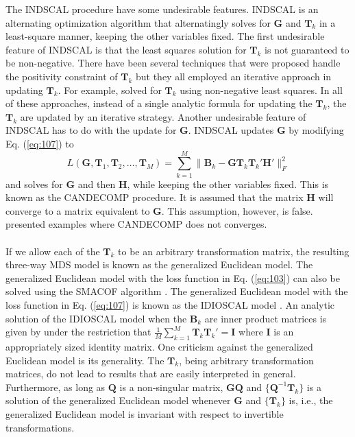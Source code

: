\noindent The INDSCAL procedure have some undesirable features.
INDSCAL is an alternating optimization algorithm that alternatingly
solves for $\mathbf{G}$ and $\mathbf{T}_k$ in a least-square manner,
keeping the other variables fixed. The first undesirable feature of
INDSCAL is that the least squares solution for
$\mathbf{T}_k$ is not guaranteed to be non-negative. There have been
several techniques that were proposed handle the positivity constraint of
$\mathbf{T}_k$ but they all employed an iterative approach in updating
$\mathbf{T}_k$. For example, \citet{berge93:_comput_indsc} solved for
$\mathbf{T}_k$ using non-negative least squares. In all of these
approaches, instead of a single analytic formula for updating the
$\mathbf{T}_k$, the $\mathbf{T}_k$ are updated by an iterative
strategy. Another undesirable feature of INDSCAL has to
do with the update for $\mathbf{G}$. INDSCAL updates
$\mathbf{G}$ by modifying Eq. (\ref{eq:107}) to
\begin{equation}
  \label{eq:108}
  L(\mathbf{G}, \mathbf{T}_1, \mathbf{T}_2, \dots, \mathbf{T}_M)
  = \sum_{k = 1}^{M}\| \mathbf{B}_k -
  \mathbf{G}\mathbf{T}_k \mathbf{T}_k' \mathbf{H}' \|_F^2 
\end{equation}
and solves for $\mathbf{G}$ and then $\mathbf{H}$, while keeping the
other variables fixed. This is known as the CANDECOMP procedure.  It is
assumed that the matrix $\mathbf{H}$ will converge to a matrix
equivalent to $\mathbf{G}$. This assumption, however, is
false. \citet{berge91:_some_candec_indsc} presented examples where
CANDECOMP does not converges. \\
\\
%
\noindent If we allow each of the $\mathbf{T}_k$ to be an arbitrary
transformation matrix, the resulting three-way MDS model is known as
the generalized Euclidean model. The generalized Euclidean model with
the loss function in Eq. (\ref{eq:103}) can also be solved using the
SMACOF algorithm \citet{leeuw80:_multiv}. The generalized Euclidean
model with the loss function in Eq. (\ref{eq:107}) is known as the
IDIOSCAL model \citep{carroll74:_contem}. An analytic solution of the
IDIOSCAL model when the $\mathbf{B}_k$ are inner
product matrices is given by \citet{schonemann72} under the restriction
that $\tfrac{1}{M}\sum_{k=1}^{M}{\mathbf{T}_k \mathbf{T}_k'} =
\mathbf{I}$ where $\mathbf{I}$ is an appropriately sized identity
matrix. One criticism against the generalized Euclidean
model is its generality. The $\mathbf{T}_k$, being arbitrary
transformation matrices, do not 
lead to results that are easily interpreted in general. Furthermore,
as long as $\mathbf{Q}$ is a non-singular matrix,
$\mathbf{G}\mathbf{Q}$ and $\{\mathbf{Q}^{-1}\mathbf{T}_k\}$ is a solution
of the generalized Euclidean model whenever $\mathbf{G}$ and
$\{\mathbf{T}_k\}$ is, i.e., the generalized Euclidean model is invariant
with respect to invertible transformations. 
